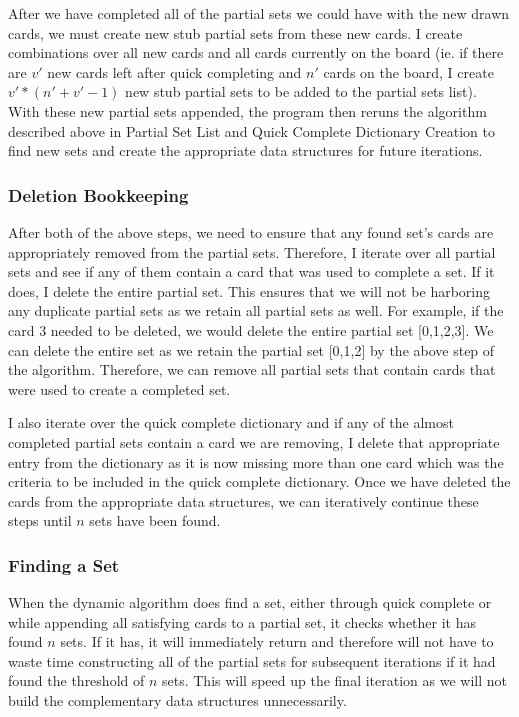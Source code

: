 \documentclass[pageno]{jpaper}
\begin{document}
After we have completed all of the partial sets we could have with the new drawn cards, we must create new stub partial sets from these new cards. I create combinations over all new cards and all cards currently on the board (ie. if there are $v'$ new cards left after quick completing and $n'$ cards on the board, I create $v'*(n'+v'-1)$ new stub partial sets to be added to the partial sets list). With these new partial sets appended, the program then reruns the algorithm described above in Partial Set List and Quick Complete Dictionary Creation to find new sets and create the appropriate data structures for future iterations. 

\subsubsection{Deletion Bookkeeping}

After both of the above steps, we need to ensure that any found set's cards are appropriately removed from the partial sets. Therefore, I iterate over all partial sets and see if any of them contain a card that was used to complete a set. If it does, I delete the entire partial set. This ensures that we will not be harboring any duplicate partial sets as we retain all partial sets as well. For example, if the card 3 needed to be deleted, we would delete the entire partial set [0,1,2,3]. We can delete the entire set as we retain the partial set [0,1,2] by the above step of the algorithm. Therefore, we can remove all partial sets that contain cards that were used to create a completed set.

I also iterate over the quick complete dictionary and if any of the almost completed partial sets contain a card we are removing, I delete that appropriate entry from the dictionary as it is now missing more than one card which was the criteria to be included in the quick complete dictionary. Once we have deleted the cards from the appropriate data structures, we can iteratively continue these steps until $n$ sets have been found. 

\subsubsection{Finding a Set}

When the dynamic algorithm does find a set, either through quick complete or while appending all satisfying cards to a partial set, it checks whether it has found $n$ sets. If it has, it will immediately return and therefore will not have to waste time constructing all of the partial sets for subsequent iterations if it had found the threshold of $n$ sets. This will speed up the final iteration as we will not build the complementary data structures unnecessarily. 
\end{document}
